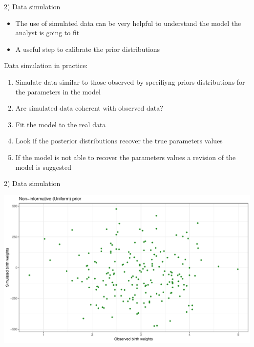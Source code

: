 \documentclass[ignorenonframetext,a4paper]{beamer}
\begin{document}
\begin{frame}{2) Data simulation}

\begin{itemize}
\setlength\itemsep{1em}
  \item{The use of simulated data can be very helpful to understand
        the model the analyst is going to fit}
  \item{A useful step to calibrate the prior distributions}
\end{itemize}

Data simulation in practice: \footnotesize

\begin{enumerate}
  \item{Simulate data similar to those observed by specifiyng priors
        distributions for the parameters in the model}
  \item{Are simulated data coherent with observed data?}
  \item{Fit the model to the real data}
  \item{Look if the posterior distributions recover the true parameters
        values}
  \item{If the model is not able to recover the parameters values a
        revision of the model is suggested}
\end{enumerate}

\end{frame}

\begin{frame}{2) Data simulation}

\includegraphics{DB_presentation_slides_files/figure-beamer/unnamed-chunk-5-1.pdf}

\end{frame}
\end{document}
